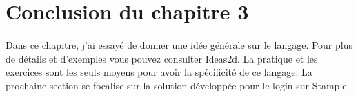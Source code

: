 \section{Conclusion du chapitre 3}
\paragraph{}
Dans ce chapitre, j'ai essayé de donner une idée générale sur le langage. Pour plus de détails et d'exemples vous pouvez consulter Ideas2d. 
La pratique et les exercices sont les seuls moyens pour avoir la spécificité de ce langage.
La prochaine section se focalise sur la solution développée pour le login sur Stample.







